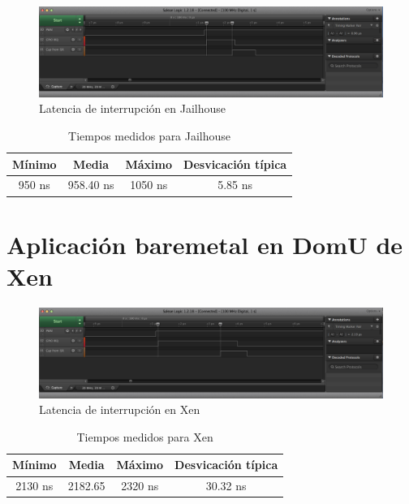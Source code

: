 \begin{figure}[!h]
  \centering
  \includegraphics[width=1.0\textwidth]{recursos/jailhouse_1_saleae.png}
  \caption{Latencia de interrupción en Jailhouse}
  \label{fig:resultados:jailhouse}
\end{figure}

\begin{table}[!ht]
  \centering
	\begin{tabular}{ |c|c|c|c| }
		\hline
    Mínimo          & Media      & Máximo  & Desvicación típica  \\
    \hline
    950 ns         & 958.40 ns      & 1050 ns    & 5.85 ns	   \\
    \hline
	\end{tabular}
	\caption{Tiempos medidos para Jailhouse}
  \label{table:results_jailhouse}
\end{table}

\section{Aplicación baremetal en DomU de Xen}

\begin{figure}[!h]
  \centering
  \includegraphics[width=1.0\textwidth]{recursos/xen_1_saleae.png}
  \caption{Latencia de interrupción en Xen}
  \label{fig:resultados:xen}
\end{figure}

\begin{table}[!ht]
  \centering
	\begin{tabular}{ |c|c|c|c| }
		\hline
    Mínimo          & Media      & Máximo  & Desvicación típica  \\
    \hline
    2130 ns         &  2182.65     & 2320 ns    & 30.32 ns	   \\
    \hline
	\end{tabular}
	\caption{Tiempos medidos para Xen}
  \label{table:results_xen}
\end{table}



